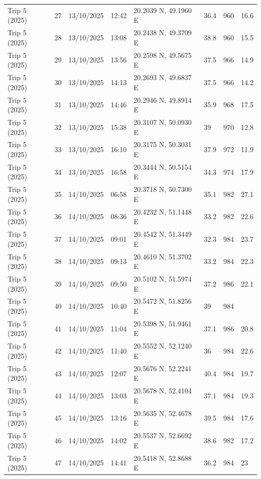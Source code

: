 \begin{scriptsize}
\begin{longtable}{llllllll}
Trip 5 (2025) & 27 & 13/10/2025 & 12:42 & 20.2039 N, 49.1960 E & 36.4 & 960 & 16.6 \\
Trip 5 (2025) & 28 & 13/10/2025 & 13:08 & 20.2438 N, 49.3709 E & 38.8 & 960 & 15.5 \\
Trip 5 (2025) & 29 & 13/10/2025 & 13:56 & 20.2598 N, 49.5675 E & 37.5 & 966 & 14.9 \\
Trip 5 (2025) & 30 & 13/10/2025 & 14:13 & 20.2693 N, 49.6837 E & 37.5 & 966 & 14.2 \\
Trip 5 (2025) & 31 & 13/10/2025 & 14:46 & 20.2946 N, 49.8914 E & 35.9 & 968 & 17.5 \\
Trip 5 (2025) & 32 & 13/10/2025 & 15:38 & 20.3107 N, 50.0930 E & 39 & 970 & 12.8 \\
Trip 5 (2025) & 33 & 13/10/2025 & 16:10 & 20.3175 N, 50.3031 E & 37.9 & 972 & 11.9 \\
Trip 5 (2025) & 34 & 13/10/2025 & 16:58 & 20.3444 N, 50.5154 E & 34.3 & 974 & 17.9 \\
Trip 5 (2025) & 35 & 14/10/2025 & 06:58 & 20.3718 N, 50.7300 E & 35.1 & 982 & 27.1 \\
Trip 5 (2025) & 36 & 14/10/2025 & 08:36 & 20.4232 N, 51.1448 E & 33.2 & 982 & 22.6 \\
Trip 5 (2025) & 37 & 14/10/2025 & 09:01 & 20.4542 N, 51.3449 E & 32.3 & 984 & 23.7 \\
Trip 5 (2025) & 38 & 14/10/2025 & 09:13 & 20.4610 N, 51.3702 E & 33.2 & 984 & 22.3 \\
Trip 5 (2025) & 39 & 14/10/2025 & 09:50 & 20.5102 N, 51.5974 E & 37.2 & 986 & 22.1 \\
Trip 5 (2025) & 40 & 14/10/2025 & 10:40 & 20.5472 N, 51.8256 E & 39 & 984 & \textemdash{} \\
Trip 5 (2025) & 41 & 14/10/2025 & 11:04 & 20.5398 N, 51.9461 E & 37.1 & 986 & 20.8 \\
Trip 5 (2025) & 42 & 14/10/2025 & 11:40 & 20.5552 N, 52.1240 E & 36 & 984 & 22.6 \\
Trip 5 (2025) & 43 & 14/10/2025 & 12:07 & 20.5676 N, 52.2241 E & 40.4 & 984 & 19.7 \\
Trip 5 (2025) & 44 & 14/10/2025 & 13:03 & 20.5678 N, 52.4104 E & 37.1 & 984 & 19.3 \\
Trip 5 (2025) & 45 & 14/10/2025 & 13:16 & 20.5635 N, 52.4678 E & 39.5 & 984 & 17.6 \\
Trip 5 (2025) & 46 & 14/10/2025 & 14:02 & 20.5537 N, 52.6692 E & 38.6 & 982 & 17.2 \\
Trip 5 (2025) & 47 & 14/10/2025 & 14:41 & 20.5418 N, 52.8688 E & 36.2 & 984 & 23 \\

\end{longtable}
\end{scriptsize}
